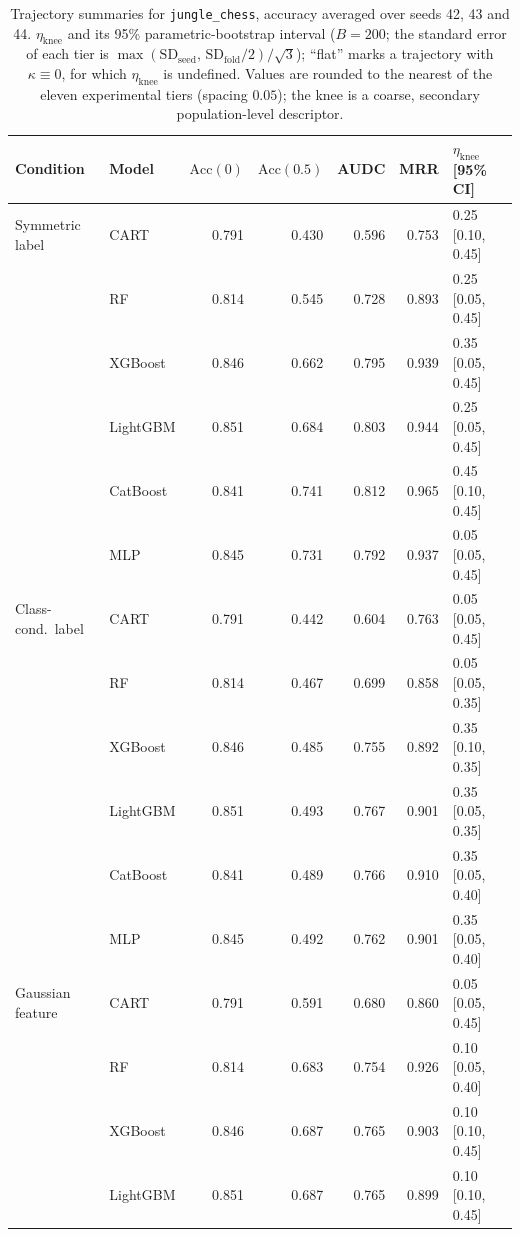 \documentclass[pdflatex,sn-mathphys]{sn-jnl}
\theoremstyle{thmstyleone}
\begin{document}
\begin{table}[htbp]
\centering
\scriptsize
\setlength{\tabcolsep}{3.5pt}
\caption{Trajectory summaries for \texttt{jungle\_chess}, accuracy averaged over seeds 42, 43 and 44. $\eta_{\mathrm{knee}}$ and its 95\% parametric-bootstrap interval ($B=200$; the standard error of each tier is $\max(\mathrm{SD}_{\mathrm{seed}},\,\mathrm{SD}_{\mathrm{fold}}/2)/\sqrt3$); ``flat'' marks a trajectory with $\kappa\equiv 0$, for which $\eta_{\mathrm{knee}}$ is undefined. Values are rounded to the nearest of the eleven experimental tiers (spacing $0.05$); the knee is a coarse, secondary population-level descriptor.}
\label{tab:traj_jungle_chess}
\begin{tabular}{@{}llrrrrl@{}}
\toprule
Condition & Model & $\mathrm{Acc}(0)$ & $\mathrm{Acc}(0.5)$ & AUDC & MRR & $\eta_{\mathrm{knee}}$ [95\% CI] \\
\midrule
Symmetric label & CART & 0.791 & 0.430 & 0.596 & 0.753 & 0.25 [0.10, 0.45] \\
 & RF & 0.814 & 0.545 & 0.728 & 0.893 & 0.25 [0.05, 0.45] \\
 & XGBoost & 0.846 & 0.662 & 0.795 & 0.939 & 0.35 [0.05, 0.45] \\
 & LightGBM & 0.851 & 0.684 & 0.803 & 0.944 & 0.25 [0.05, 0.45] \\
 & CatBoost & 0.841 & 0.741 & 0.812 & 0.965 & 0.45 [0.10, 0.45] \\
 & MLP & 0.845 & 0.731 & 0.792 & 0.937 & 0.05 [0.05, 0.45] \\
\midrule
Class-cond.\ label & CART & 0.791 & 0.442 & 0.604 & 0.763 & 0.05 [0.05, 0.45] \\
 & RF & 0.814 & 0.467 & 0.699 & 0.858 & 0.05 [0.05, 0.35] \\
 & XGBoost & 0.846 & 0.485 & 0.755 & 0.892 & 0.35 [0.10, 0.35] \\
 & LightGBM & 0.851 & 0.493 & 0.767 & 0.901 & 0.35 [0.05, 0.35] \\
 & CatBoost & 0.841 & 0.489 & 0.766 & 0.910 & 0.35 [0.05, 0.40] \\
 & MLP & 0.845 & 0.492 & 0.762 & 0.901 & 0.35 [0.05, 0.40] \\
\midrule
Gaussian feature & CART & 0.791 & 0.591 & 0.680 & 0.860 & 0.05 [0.05, 0.45] \\
 & RF & 0.814 & 0.683 & 0.754 & 0.926 & 0.10 [0.05, 0.40] \\
 & XGBoost & 0.846 & 0.687 & 0.765 & 0.903 & 0.10 [0.10, 0.45] \\
 & LightGBM & 0.851 & 0.687 & 0.765 & 0.899 & 0.10 [0.10, 0.45] \\

\end{tabular}
\end{table}
\end{document}
